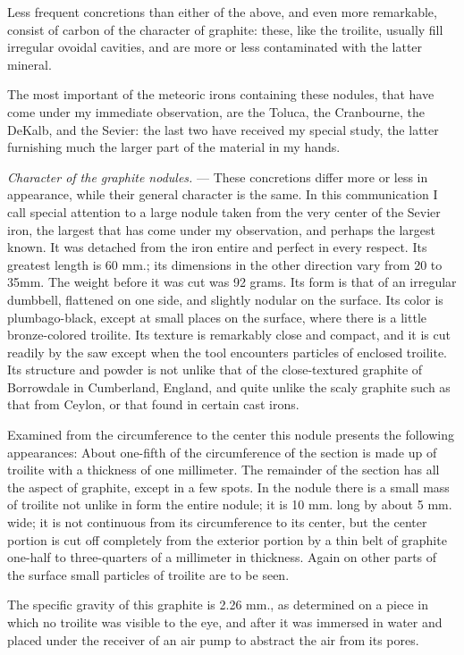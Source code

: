 \documentclass[a4paper, 11pt, oneside, english]{article}
\begin{document}
Less frequent concretions than either of the above, and even more remarkable, consist of carbon of the character of graphite: these, like the troilite, usually fill irregular ovoidal cavities, and are more or less contaminated with the latter mineral.

The most important of the meteoric irons containing these nodules, that have come under my immediate observation, are the Toluca, the Cranbourne, the DeKalb, and the Sevier: the last two have received my special study, the latter furnishing much the larger part of the material in my hands.

\emph{Character of the graphite nodules.} --- These concretions differ more or less in appearance, while their general character is the same. In this communication I call special attention to a large nodule taken from the very center of the Sevier iron, the largest that has come under my observation, and perhaps the largest known. It was detached from the iron entire and perfect in every respect. Its greatest length is 60 mm.; its dimensions in the other direction vary from 20 to 35mm. The weight before it was cut was 92 grams. Its form is that of an irregular dumbbell, flattened on one side, and slightly nodular on the surface. Its color is plumbago-black, except at small places on the surface, where there is a little bronze-colored troilite. Its texture is remarkably close and compact, and it is cut readily by the saw except when the tool encounters particles of enclosed troilite. Its structure and powder is not unlike that of the close-textured graphite of Borrowdale in Cumberland, England, and quite unlike the scaly graphite such as that from Ceylon, or that found in certain cast irons.

Examined from the circumference to the center this nodule presents the following appearances: About one-fifth of the circumference of the section is made up of troilite with a thickness of one millimeter. The remainder of the section has all the aspect of graphite, except in a few spots. In the nodule there is a small mass of troilite not unlike in form the entire nodule; it is 10 mm. long by about 5 mm. wide; it is not continuous from its circumference to its center, but the center portion is cut off completely from the exterior portion by a thin belt of graphite one-half to three-quarters of a millimeter in thickness. Again on other parts of the surface small particles of troilite are to be seen.

The specific gravity of this graphite is 2.26 mm., as determined on a piece in which no troilite was visible to the eye, and after it was immersed in water and placed under the receiver of an air pump to abstract the air from its pores.
\end{document}
